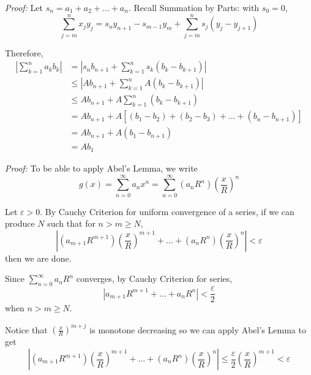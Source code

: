 \documentclass[12pt]{report}
\newcommand{\abs}[1]{\left\vert #1 \right\vert}
\newcommand{\ep}{\varepsilon}
\newenvironment*{tbox}[2][gray]{
    \begin{tcolorbox}[
        parbox=false,
        colback=#1!5!white,
        colframe=#1!75!black,
        breakable,
        title={#2}
    ]}
    {\end{tcolorbox}}
\begin{document}
        \begin{tbox}{\textbf{Abel's Lemma:} Let $(b_n)$ satisfy $b_1 \geq b_2 \geq \dots \geq 0$ and let $\sum_{n=0}^\infty a_n$ be a series for which the partial sums are bounded. Then, $\exists A$ such that 
        \[\abs{a_1 b_1 + a_2 b_2 + \dots + a_n b_n} \leq A\cdot b_1\]}
            \emph{Proof:} Let $s_n = a_1 + a_2 + \dots + a_n$. Recall Summation by Parts: with $s_0 = 0$,
            \[\sum_{j=m}^{n} x_j y_j = s_n y_{n+1} - s_{m-1}y_m + \sum_{j=m}^n s_j(y_j - y_{j+1})\]

            Therefore, 
            \begin{align*}
                \abs{\sum_{k=1}^n a_k b_k} &= \abs{s_n b_{n+1} + \sum_{k=1}^n s_k(b_k - b_{k+1})}\\ 
                    &\leq \abs{Ab_{n+1} + \sum_{k=1}^n A(b_k - b_{k+1})}\\
                    &\leq Ab_{n+1} + A \sum_{k=1}^n (b_k - b_{k+1})\\ 
                    &= Ab_{n+1} + A\left[(b_1 - b_2) + (b_2 - b_3) + \dots + (b_n - b_{n+1})\right]\\
                    &= Ab_{n+1} + A(b_1 - b_{n+1})\\
                    &= A b_1
            \end{align*}
        \end{tbox}

        \begin{tbox}{\textbf{Abel's Theorem:} Let $g(x) = \sum_{n=0}^{\infty} a_nx^n$ be a power series that converges at the point $x = R > 0$. Then $g(x)$ converges uniformly on $[0, R]$. A similar result holds if the series converges at $x = -R$.}
            \emph{Proof:} To be able to apply Abel's Lemma, we write 
            \[g(x) = \sum_{n=0}^{\infty} a_n x^n = \sum_{n=0}^\infty (a_n R^n) \left(\frac{x}{R}\right)^n\]

            Let $\ep > 0$. By Cauchy Criterion for uniform convergence of a series, if we can produce $N$ such that for $n > m \geq N$,
            \[\abs{(a_{m+1} R^{m+1})\left(\frac{x}{R}\right)^{m+1} + \dots + (a_n R^n) \left(\frac{x}{R}\right)^n} < \ep\]
            then we are done. 

            Since $\sum_{n=0}^\infty a_n R^n$ converges, by Cauchy Criterion for series, 
            \[\abs{a_{m+1} R^{m+1} + \dots + a_n R^n} < \frac{\ep}{2}\]
            when $n > m \geq N$. 

            Notice that $\left(\frac{x}{R}\right)^{m+j}$ is monotone decreasing so we can apply Abel's Lemma to get
            \[\abs{(a_{m+1} R^{m+1})\left(\frac{x}{R}\right)^{m+1} + \dots + (a_n R^n) \left(\frac{x}{R}\right)^n} \leq \frac{\ep}{2} \left(\frac{x}{R}\right)^{m+1} < \ep\]
        \end{tbox}
\end{document}
